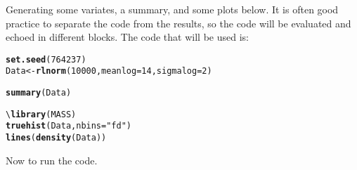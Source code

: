 \documentclass[letterpaper]{article}\usepackage[]{graphicx}\usepackage[]{color}
\makeatletter
\newcommand{\hlnum}[1]{\textcolor[rgb]{0.686,0.059,0.569}{#1}}%
\newcommand{\hlstr}[1]{\textcolor[rgb]{0.192,0.494,0.8}{#1}}%
\newcommand{\hlstd}[1]{\textcolor[rgb]{0.345,0.345,0.345}{#1}}%
\newcommand{\hlkwb}[1]{\textcolor[rgb]{0.69,0.353,0.396}{#1}}%
\newcommand{\hlkwc}[1]{\textcolor[rgb]{0.333,0.667,0.333}{#1}}%
\newcommand{\hlkwd}[1]{\textcolor[rgb]{0.737,0.353,0.396}{\textbf{#1}}}%
\newenvironment{kframe}{%
 \def\at@end@of@kframe{}%
 \ifinner\ifhmode%
  \def\at@end@of@kframe{\end{minipage}}%
  \begin{minipage}{\columnwidth}%
 \fi\fi%
 \def\FrameCommand##1{\hskip\@totalleftmargin \hskip-\fboxsep
 \colorbox{shadecolor}{##1}\hskip-\fboxsep
     \hskip-\linewidth \hskip-\@totalleftmargin \hskip\columnwidth}%
 \MakeFramed {\advance\hsize-\width
   \@totalleftmargin\z@ \linewidth\hsize
   \@setminipage}}%
 {\par\unskip\endMakeFramed%
 \at@end@of@kframe}
\newenvironment{knitrout}{}{} %
\makeatother
\begin{document}
Generating some variates, a summary, and some plots below. It is often good practice to separate the code from the results, so the code will be evaluated and echoed in different blocks. The code that will be used is:
\begin{knitrout}
\color{fgcolor}\begin{kframe}
\begin{alltt}
\hlkwd{set.seed}\hlstd{(}\hlnum{764237}\hlstd{)}
\hlstd{Data} \hlkwb{<-} \hlkwd{rlnorm}\hlstd{(}\hlnum{10000}\hlstd{,} \hlkwc{meanlog} \hlstd{=} \hlnum{14}\hlstd{,} \hlkwc{sigmalog} \hlstd{=} \hlnum{2}\hlstd{)}
\end{alltt}
\end{kframe}
\end{knitrout}

\begin{knitrout}
\color{fgcolor}\begin{kframe}
\begin{alltt}
\hlkwd{summary}\hlstd{(Data)}
\end{alltt}
\end{kframe}
\end{knitrout}

\begin{knitrout}
\color{fgcolor}\begin{kframe}
\begin{alltt}
\textbackslash{}\hlkwd{library}(MASS)
\hlkwd{truehist}(Data, nbins=\hlstr{"fd"})
\hlkwd{lines}(\hlkwd{density}(Data))
\end{alltt}
\end{kframe}
\end{knitrout}

Now to run the code.
\begin{knitrout}
\color{fgcolor}\begin{kframe}


{\ttfamily\noindent\bfseries\color{errorcolor}{\#\# Error: unused argument (sigmalog = 2)}}\end{kframe}
\end{knitrout}

\begin{knitrout}
\color{fgcolor}\begin{kframe}


{\ttfamily\noindent\bfseries\color{errorcolor}{\#\# Error: object 'Data' not found}}\end{kframe}
\end{knitrout}
\end{document}

